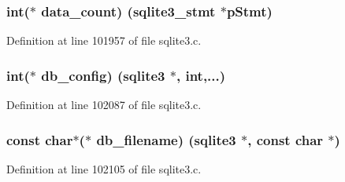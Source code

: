 \hypertarget{structsqlite3__api__routines_af251752525fef010bd8d98fd5af26aa3}{}
\subsubsection[{data\+\_\+count}]{\setlength{\rightskip}{0pt plus 5cm}int($\ast$ data\+\_\+count) ({\bf sqlite3\+\_\+stmt} $\ast$p\+Stmt)}\label{structsqlite3__api__routines_af251752525fef010bd8d98fd5af26aa3}


Definition at line 101957 of file sqlite3.\+c.

\hypertarget{structsqlite3__api__routines_a1a068c64c4681b33e8477b65f7e2c56d}{}
\subsubsection[{db\+\_\+config}]{\setlength{\rightskip}{0pt plus 5cm}int($\ast$ db\+\_\+config) ({\bf sqlite3} $\ast$, int,...)}\label{structsqlite3__api__routines_a1a068c64c4681b33e8477b65f7e2c56d}


Definition at line 102087 of file sqlite3.\+c.

\hypertarget{structsqlite3__api__routines_a0db6c1395cbeed5927f8cf58199d683c}{}
\subsubsection[{db\+\_\+filename}]{\setlength{\rightskip}{0pt plus 5cm}const char$\ast$($\ast$ db\+\_\+filename) ({\bf sqlite3} $\ast$, const char $\ast$)}\label{structsqlite3__api__routines_a0db6c1395cbeed5927f8cf58199d683c}


Definition at line 102105 of file sqlite3.\+c.

\hypertarget{structsqlite3__api__routines_aac07d5898204bc18ddf5b45cc52c3062}{}
